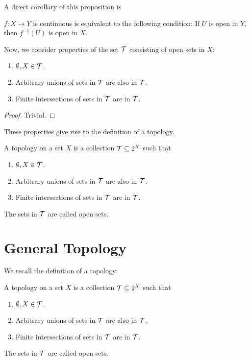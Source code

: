 A direct corollary of this proposition is 
\begin{corollary}
    $f\colon X \to Y$ is continuous is equivalent to the following condition: If $U$ is open in $Y$, then $f^{-1}(U)$ is open in $X$.
\end{corollary}

Now, we consider properties of the set $\mathcal T$ consisting of open sets in $X$:

\begin{theorem}
    \begin{enumerate}
        \item $\emptyset, X \in \mathcal T$.
        \item Arbitrary unions of sets in $\mathcal T$ are also in $\mathcal T$.
        \item Finite intersections of sets in $\mathcal T$ are in $\mathcal T$.
    \end{enumerate}
\end{theorem}
\begin{proof}
    Trivial.
\end{proof}

These properties give rise to the definition of a topology.

\begin{definition}[Topology]
    A topology on a set $X$ is a collection $\mathcal T \subseteq 2^X$ such that \begin{enumerate}
        \item $\emptyset, X \in \mathcal T$.
        \item Arbitrary unions of sets in $\mathcal T$ are also in $\mathcal T$.
        \item Finite intersections of sets in $\mathcal T$ are in $\mathcal T$.
    \end{enumerate}

    The sets in $\mathcal T$ are called open sets.
\end{definition}

\section{General Topology}

We recall the definition of a topology:

\begin{definition}[Topology]
    A topology on a set $X$ is a collection $\mathcal T \subseteq 2^X$ such that \begin{enumerate}
        \item $\emptyset, X \in \mathcal T$.
        \item Arbitrary unions of sets in $\mathcal T$ are also in $\mathcal T$.
        \item Finite intersections of sets in $\mathcal T$ are in $\mathcal T$.
    \end{enumerate}

    The sets in $\mathcal T$ are called open sets.
\end{definition}

